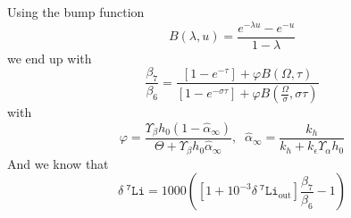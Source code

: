 \documentclass[aps,onecolumn,12pt]{revtex4}
\newcommand{\mychem}[1]{\mathtt{#1}}
\newcommand{\spLi}[1]{{~^{\mychem{#1}}\mychem{Li}}}
\newcommand{\deltaLi}{ {\delta\!\!\!\spLi{7}} }
\newcommand{\deltaLiOut}{{\deltaLi}_{\mathrm{out}}}
\begin{document}
Using the bump function
\begin{equation}
	B(\lambda,u) = \dfrac{e^{-\lambda u}-e^{-u}}{1-\lambda}
\end{equation}
we end up with
\begin{equation}
	\dfrac{\beta_7}{\beta_6} = 
	\dfrac{\left[1-e^{-\tau}\right] + \varphi B(\Omega,\tau) }
	{\left[1-e^{-\sigma\tau}\right] + \varphi B(\frac{\Omega}{\sigma},\sigma\tau)}
\end{equation}
with
\begin{equation}
	\varphi = \dfrac{\Upsilon_\beta h_0 \left(1-\hat\alpha_\infty\right)}{\Theta+\Upsilon_\beta h_0 \hat\alpha_\infty}
	,\;\; \hat\alpha_\infty = \dfrac{k_h}{k_h+k_\epsilon \Upsilon_\alpha h_0 }
\end{equation}
And we know that
\begin{equation}
	\deltaLi = 1000 \left( \left[1+10^{-3}\deltaLiOut\right]\dfrac{\beta_7}{\beta_6} - 1\right)
\end{equation}
\end{document}

